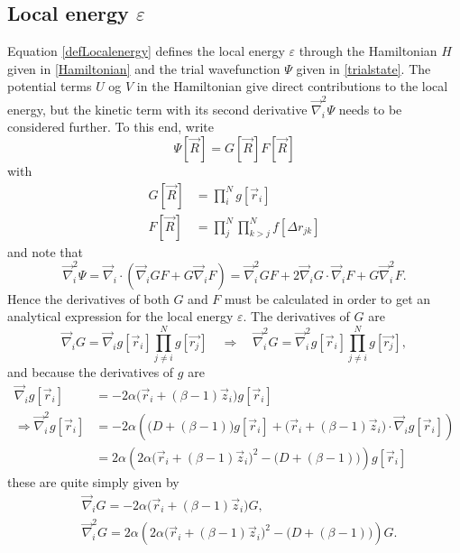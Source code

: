 \documentclass[a4paper,8pt]{article}
\begin{document}
\subsection{Local energy $\varepsilon$} \label{localenergy}
Equation \eqref{defLocalenergy} defines the local energy $\varepsilon$ through the Hamiltonian $H$ given in \eqref{Hamiltonian} and the trial wavefunction $\Psi$ given in \eqref{trialstate}. The potential terms $U$ og $V$ in the Hamiltonian give direct contributions to the local energy, but the kinetic term with its second derivative $\vec{\nabla}_i^2\Psi$ needs to be considered further. To this end, write
\begin{equation}
\Psi[\vec{R}] = G[\vec{R}]F[\vec{R}]
\end{equation}
with
\begin{align}
G[\vec{R}] &= \prod\limits_i^N g[\vec{r}_i] \\
F[\vec{R}] &= \prod\limits_j^N\prod\limits_{k > j}^N f[\Delta{r}_{jk}] 
\end{align}
and note that
\begin{equation}
\vec{\nabla}_i^2\Psi = \vec{\nabla}_i\cdot\left(\vec{\nabla}_i G F + G \vec{\nabla}_i F\right) = \vec{\nabla}_i^2 G F + 2\vec{\nabla}_i G \cdot \vec{\nabla}_i F + G \vec{\nabla}_i^2 F. \label{Lap_Psi_1} 
\end{equation}
Hence the derivatives of both $G$ and $F$ must be calculated in order to get an analytical expression for the local energy $\varepsilon$. The derivatives of $G$ are 
\begin{equation}
\vec{\nabla}_i G = \vec{\nabla}_i g[\vec{r}_i] \prod\limits_{j \neq i}^N g[\vec{r_j}] \quad\Longrightarrow\quad \vec{\nabla}_i^2 G = \vec{\nabla}_i^2 g[\vec{r}_i] \prod\limits_{j \neq i}^N g[\vec{r_j}],
\end{equation}
and because the derivatives of $g$ are
\begin{align}
\vec{\nabla}_i g[\vec{r}_i] &= -2\alpha\Big(\vec{r}_i+(\beta-1)\vec{z}_i\Big)g[\vec{r}_i] \\
\Longrightarrow \vec{\nabla}_i^2 g[\vec{r}_i] &= -2\alpha\left(\Big(D+(\beta-1)\Big)g[\vec{r}_i]+\Big(\vec{r}_i+(\beta-1)\vec{z}_i\Big)\cdot\vec{\nabla}_i g[\vec{r}_i]\right) \nonumber\\
&= 2\alpha\left(2\alpha\Big(\vec{r}_i+(\beta-1)\vec{z}_i\Big)^2-\Big(D+(\beta-1)\Big)\right)g[\vec{r}_i]
\end{align}
these are quite simply given by
\begin{align}
&\vec{\nabla}_i G = -2\alpha\Big(\vec{r}_i+(\beta-1)\vec{z}_i\Big)G, \label{grad_G}\\
&\vec{\nabla}_i^2G = 2\alpha\left(2\alpha\Big(\vec{r}_i+(\beta-1)\vec{z}_i\Big)^2-\Big(D+(\beta-1)\Big)\right)G. \label{Lap_G}
\end{align}
\end{document}

